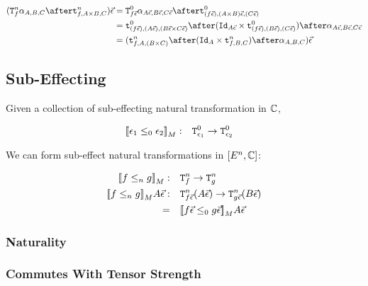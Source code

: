 \documentclass{report}
\newcommand{\Tz}[2]{\texttt{T}^0_{#1}#2}
\newcommand{\Tn}[2]{\texttt{T}^n_{#1}#2}
\newcommand\tstrengthz[3]{\tstrength{#1}{#2}{#3}^0}
\newcommand\tstrengthn[3]{\tstrength{#1}{#2}{#3}^n}
\newcommand\ev[0]{\vec{\e}}
\newcommand\subeffectz[0]{\subeffect_0}
\newcommand\subeffectn[0]{\subeffect_n}
\begin{document}
\begin{align}
    (\Tn{f}{\alpha_{A, B, C}}\after\tstrengthn{f}{A\times B}{C})\ev & = \Tz{f\ev}{\alpha_{A\ev, B\ev, C\ev}} \after\tstrengthz{(f\ev)}{(A\times B)\ev}{(C\ev)}\\
    & = \tstrengthz{(f\ev)}{(A\ev)}{(B\ev\times C\ev)}\after(\Id{A\ev}\times \tstrengthz{(f\ev)}{(B\ev)}{(C\ev)})\after\alpha_{A\ev, B\ev, C\ev}\\
    & = (\tstrengthn{f}{A}{(B\times C)}\after(\Id{A}\times \tstrengthn{f}{B}{C})\after\alpha_{A, B, C})\ev\\
\end{align}


\subsection{Sub-Effecting}
Given a collection of sub-effecting natural transformation in $\mathbb{C}$,

\begin{align}
    \deno{\e_1\subeffectz \e_2}:&\quad \Tz{\e_1}{} \rightarrow \Tz{\e_2}{}
\end{align}

We can form sub-effect natural transformations in $[E^n, \mathbb{C}]$:

\begin{align}
    \deno{f\subeffectn g}:&\quad\Tn{f}{}\rightarrow \Tn{g}{}\\
    \deno{f\subeffectn g} A \ev:&\quad\Tn{f\ev}{(A\ev)}\rightarrow \Tn{g\ev}{(B\ev)}\\
    =&\quad \deno{f\ev\subeffectz g\ev}A\ev
\end{align}

\subsubsection{Naturality}


\subsubsection{Commutes With Tensor Strength}
\end{document}

